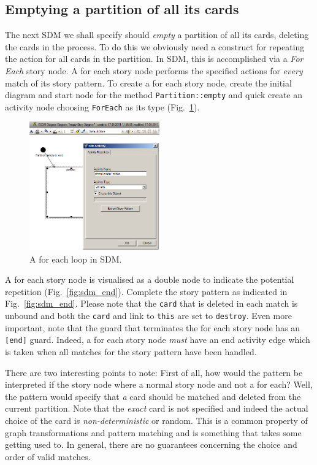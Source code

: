 \subsection{Emptying a partition of all its cards}
\label{sec:empty}

The next SDM we shall specify should \emph{empty} a partition of all its cards,
deleting the cards in the process.  To do this we obviously need a construct for
repeating the action for all cards in the partition.  In SDM, this is
accomplished via a \emph{For Each} story node.  A for each story node performs
the specified actions for \emph{every} match of its story pattern.  To create a
for each story node, create the initial diagram and start node for the method
\texttt{Partition::empty} and quick create an activity node choosing
\texttt{ForEach} as its type (Fig.~\ref{fig:sdm_foreach}).

\begin{figure}[htp]
\begin{center}
  \includegraphics[width=0.5\textwidth]{pics/sdmBilder/empty/sdm42RAW}
  \caption{A for each loop in SDM.}  
  \label{fig:sdm_foreach}
\end{center}
\end{figure}

A for each story node is visualised as a double node to indicate the
potential repetition (Fig.~\ref{fig:sdm_end}). Complete the story pattern as
indicated in Fig.~\ref{fig:sdm_end}.  Please note that the \texttt{card} that is
deleted in each match is unbound and both the \texttt{card} and link to
\texttt{this} are set to \texttt{destroy}.  Even more important, note that the
guard that terminates the for each story node has an \texttt{[end]} guard. 
Indeed, a for each story node \emph{must} have an end activity edge which is
taken when all matches for the story pattern have been handled.

There are two interesting points to note: First of all, how would the pattern be
interpreted if the story node where a normal story node and not a for each?
Well, the pattern would specify that \emph{a} card should
be matched and deleted from the current partition.  Note that the \emph{exact}
card is not specified and indeed the actual choice of the card is
\emph{non-deterministic} or random.  This is a common property of graph
transformations and pattern matching and is something that takes some getting
used to. In general, there are no guarantees concerning the choice and order of
valid matches.

